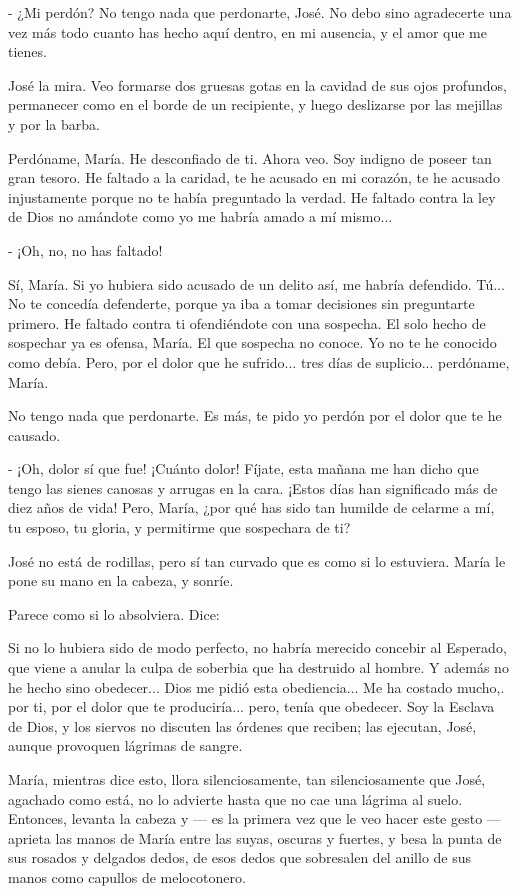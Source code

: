 \documentclass[12pt, twoside, openright]{book} %
\begin{document}
- ¿Mi perdón? No tengo nada que perdonarte, José. No debo sino agradecerte una vez más todo cuanto has hecho aquí dentro, en mi ausencia, y el amor que me tienes. 

José la mira. Veo formarse dos gruesas gotas en la cavidad de sus ojos profundos, permanecer como en el borde de un recipiente, y luego deslizarse por las mejillas y por la barba. 

Perdóname, María. He desconfiado de ti. Ahora veo. Soy indigno de poseer tan gran tesoro. He faltado a la caridad, te he acusado en mi corazón, te he acusado injustamente porque no te había preguntado la verdad. He faltado contra la ley de Dios no amándote como yo me habría amado a mí mismo... 

- ¡Oh, no, no has faltado! 

Sí, María. Si yo hubiera sido acusado de un delito así, me habría defendido. Tú... No te concedía defenderte, porque ya iba a tomar decisiones sin preguntarte primero. He faltado contra ti ofendiéndote con una sospecha. El solo hecho de sospechar ya es ofensa, María. El que sospecha no conoce. Yo no te he conocido como debía. Pero, por el dolor que he sufrido... tres días de suplicio... perdóname, María. 

No tengo nada que perdonarte. Es más, te pido yo perdón por el dolor que te he causado. 

- ¡Oh, dolor sí que fue! ¡Cuánto dolor! Fíjate, esta mañana me han dicho que tengo las sienes canosas y arrugas en la cara. ¡Estos días han significado más de diez años de vida! Pero, María, ¿por qué has sido tan humilde de celarme a mí, tu esposo, tu gloria, y permitirme que sospechara de ti? 

José no está de rodillas, pero sí tan curvado que es como si lo estuviera. María le pone su mano en la cabeza, y sonríe. 

Parece como si lo absolviera. Dice: 

Si no lo hubiera sido de modo perfecto, no habría merecido concebir al Esperado, que viene a anular la culpa de soberbia que ha destruido al hombre. Y además no he hecho sino obedecer... Dios me pidió esta obediencia... Me ha costado mucho,. por ti, por el dolor que te produciría... pero, tenía que obedecer. Soy la Esclava de Dios, y los siervos no discuten las órdenes que reciben; las ejecutan, José, aunque provoquen lágrimas de sangre. 

María, mientras dice esto, llora silenciosamente, tan silenciosamente que José, agachado como está, no lo advierte hasta que no cae una lágrima al suelo. Entonces, levanta la cabeza y — es la primera vez que le veo hacer este gesto — aprieta las manos de María entre las suyas, oscuras y fuertes, y besa la punta de sus rosados y delgados dedos, de esos dedos que sobresalen del anillo de sus manos como capullos de melocotonero. 
\end{document}
